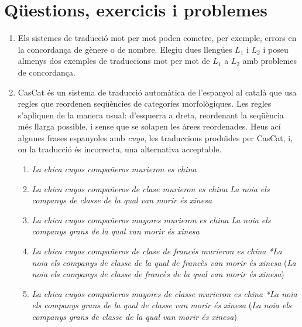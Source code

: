 \section{Qüestions, exercicis i problemes}
\begin{enumerate}
\item Els sistemes de traducció mot per mot poden cometre, per
  exemple, errors en la concordança de gènere o de nombre.  Elegiu
  dues llengües $L_1$ i $L_2$ i poseu almenys dos exemples de
  traduccions mot per mot de $L_1$ a $L_2$ amb problemes de concordança.

\item \label{ex:cascat} CasCat és un sistema de traducció automàtica de l'espanyol al català que usa regles que reordenen seqüències
  de categories morfològiques. Les regles s'apliquen de la manera
  usual: d'esquerra a dreta, reordenant la seqüència més
  llarga possible, i sense que se solapen les àrees reordenades.
Heus ací algunes frases espanyoles  amb {\em
  cuyo},  les traduccions produ\"{\i}des per CasCat, i, on la
  traducció és incorrecta, una alternativa acceptable.
\begin{enumerate}
  
\item \emph{La chica cuyos compañeros murieron es china} 

\item \emph{La chica cuyos compañeros de clase murieron es china}
  \newline \emph{La noia els companys de classe de la qual van morir és
    xinesa}

\item \emph{La chica cuyos compañeros mayores murieron es china}
  \newline \emph{La noia els companys grans de la qual van morir és
    xinesa}

\item \emph{La chica cuyos compañeros de clase de francés murieron es
    china} \newline \emph{*La noia els companys de classe de la qual de
    francès van morir és xinesa} \newline (\emph{La noia els companys
    de classe de francès de la qual van morir és xinesa})

\item \emph{La chica cuyos compañeros mayores de classe murieron es
    china} \newline \emph{*La noia els companys grans de la qual de
    classe van morir és xinesa} \newline (\emph{La noia els companys grans de
    classe de la qual van morir és xinesa})


\end{enumerate}
\end{enumerate}

